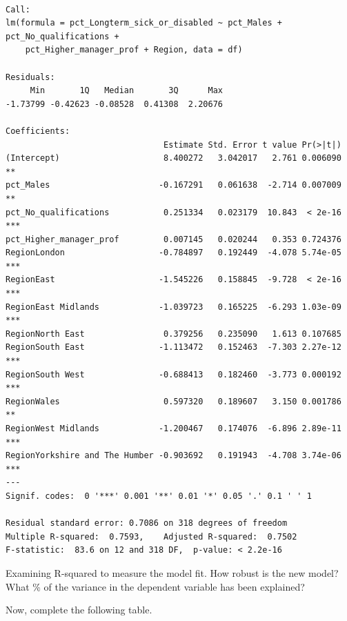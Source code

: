 \documentclass[
  letterpaper,
  DIV=11,
  numbers=noendperiod]{scrreprt}
\begin{document}
\begin{verbatim}

Call:
lm(formula = pct_Longterm_sick_or_disabled ~ pct_Males + pct_No_qualifications + 
    pct_Higher_manager_prof + Region, data = df)

Residuals:
     Min       1Q   Median       3Q      Max 
-1.73799 -0.42623 -0.08528  0.41308  2.20676 

Coefficients:
                                Estimate Std. Error t value Pr(>|t|)    
(Intercept)                     8.400272   3.042017   2.761 0.006090 ** 
pct_Males                      -0.167291   0.061638  -2.714 0.007009 ** 
pct_No_qualifications           0.251334   0.023179  10.843  < 2e-16 ***
pct_Higher_manager_prof         0.007145   0.020244   0.353 0.724376    
RegionLondon                   -0.784897   0.192449  -4.078 5.74e-05 ***
RegionEast                     -1.545226   0.158845  -9.728  < 2e-16 ***
RegionEast Midlands            -1.039723   0.165225  -6.293 1.03e-09 ***
RegionNorth East                0.379256   0.235090   1.613 0.107685    
RegionSouth East               -1.113472   0.152463  -7.303 2.27e-12 ***
RegionSouth West               -0.688413   0.182460  -3.773 0.000192 ***
RegionWales                     0.597320   0.189607   3.150 0.001786 ** 
RegionWest Midlands            -1.200467   0.174076  -6.896 2.89e-11 ***
RegionYorkshire and The Humber -0.903692   0.191943  -4.708 3.74e-06 ***
---
Signif. codes:  0 '***' 0.001 '**' 0.01 '*' 0.05 '.' 0.1 ' ' 1

Residual standard error: 0.7086 on 318 degrees of freedom
Multiple R-squared:  0.7593,    Adjusted R-squared:  0.7502 
F-statistic:  83.6 on 12 and 318 DF,  p-value: < 2.2e-16
\end{verbatim}

Examining R-squared to measure the model fit. How robust is the new
model? What \% of the variance in the dependent variable has been
explained?

Now, complete the following table.
\end{document}
